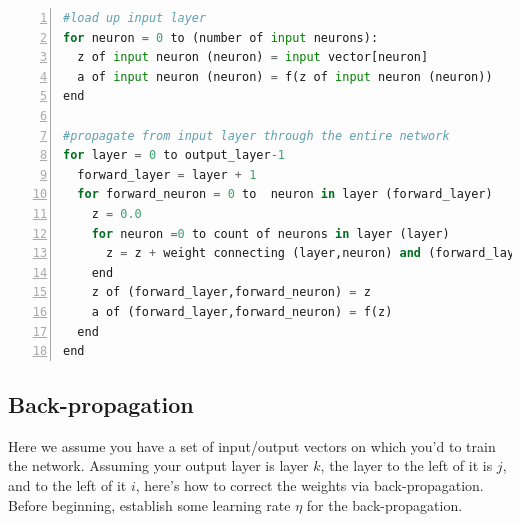 \documentclass[12pt]{article}
\begin{document}
\begin{lstlisting}[language=Python,
		basicstyle=\small\ttfamily,
                 numbers=left,
                 stepnumber=1,
                 numbersep=8pt,
                 tabsize=2,
                 showspaces=false,
                 breaklines=true,
                 showstringspaces=false,
                 columns=fullflexible]
#load up input layer
for neuron = 0 to (number of input neurons):
  z of input neuron (neuron) = input vector[neuron]
  a of input neuron (neuron) = f(z of input neuron (neuron))
end
	
#propagate from input layer through the entire network
for layer = 0 to output_layer-1
  forward_layer = layer + 1
  for forward_neuron = 0 to  neuron in layer (forward_layer)
    z = 0.0
    for neuron =0 to count of neurons in layer (layer)
      z = z + weight connecting (layer,neuron) and (forward_layer,forward_neuron) * a of (layer,neuron)  + bias of (layer,neuron)
    end
    z of (forward_layer,forward_neuron) = z
    a of (forward_layer,forward_neuron) = f(z)
  end
end
\end{lstlisting}

\subsection{Back-propagation}

Here we assume you have a set of input/output vectors on which you'd to train the network.  Assuming your output layer is layer $k$, the layer to the left of it is $j$, and to the left of it $i$, here's how to correct the weights via back-propagation. Before beginning, establish some learning rate $\eta$ for the back-propagation.
\end{document}
